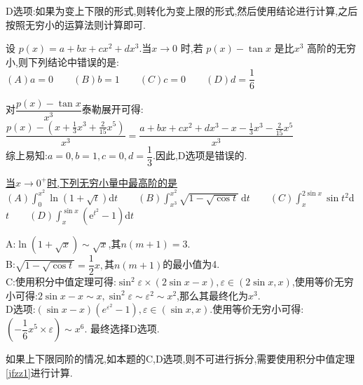 \documentclass[8pt a4paper, oneside, UTF8]{ctexbook}
\begin{document}
\begin{sloppypar}
\begin{solution}
    \end{solution}
    \begin{note}
        D选项:如果为变上下限的形式,则转化为变上限的形式,然后使用结论进行计算,之后按照无穷小的运算法则计算即可.
    \end{note}
    \begin{problem}
    设 $p(x)=a+bx+cx^2+dx^3$.当$x\to0$ 时,若 $p(x)-\tan x$ 是比$x^{3}$ 高阶的无穷小,则下列结论中错误的是:\\
    $(A)a=0 \qquad (B)b=1 \qquad (C)c=0 \qquad (D)d=\dfrac{1}{6}$
    \end{problem}
    \begin{solution}
        对$\dfrac{p(x)-\tan x}{x^3}$泰勒展开可得:$\dfrac{p(x)-(x+\frac13x^3+\frac2{15}x^5)}{x^3}=\dfrac{a+bx+cx^2+dx^3-x-\frac{1}{3}x^3-\frac{2}{15}x^5}{x^3}$\\
        综上易知:$a=0,b=1,c=0,d=\dfrac{1}{3}$.因此,D选项是错误的.
    \end{solution}
    \begin{problem}
    \uline{当$x\to0^+$时,下列无穷小量中最高阶的是} \\
    $(A)\int _0^{x^2}\ln ( 1+ {\sqrt {t}}) $d$t \qquad (B) \int_{x^{3}}^{x^{2}}\sqrt{1-\sqrt{\cos t}}\:\mathrm{d}t \qquad (C)\int _x^{2\sin x}\sin t^2$d$t \qquad (D) \int _x^{\sin x}( \mathrm{e} ^{t^2}- 1) $d$t$
    \end{problem}
    \begin{solution}
        A:$\ln(1+\sqrt{x}) \sim \sqrt{x}$,其$n(m+1)=3$.\\B:$\sqrt{1-\sqrt{\cos t}}=\dfrac{1}{2}x,$其$n(m+1)$的最小值为4.\\C:使用积分中值定理可得:$\sin^2 \varepsilon \times (2\sin x- x),\varepsilon \in (2\sin x,x)$,使用等价无穷小可得:$2\sin x-x \sim x,\sin^2 \varepsilon \sim \varepsilon ^2 \sim x^2$,那么其最终化为$x^3$.\\D选项:$(\sin x - x)(e^{\varepsilon ^2}-1),\varepsilon \in (\sin x,x)$.使用等价无穷小可得:$(-\dfrac{1}{6}x^5 \times \varepsilon)\sim x^6$. 最终选择D选项.
    \end{solution}
    \begin{note}
        如果上下限同阶的情况,如本题的C,D选项,则不可进行拆分,需要使用积分中值定理\ref{jfzz1}进行计算.
    \end{note}

\end{sloppypar}
\end{document}
